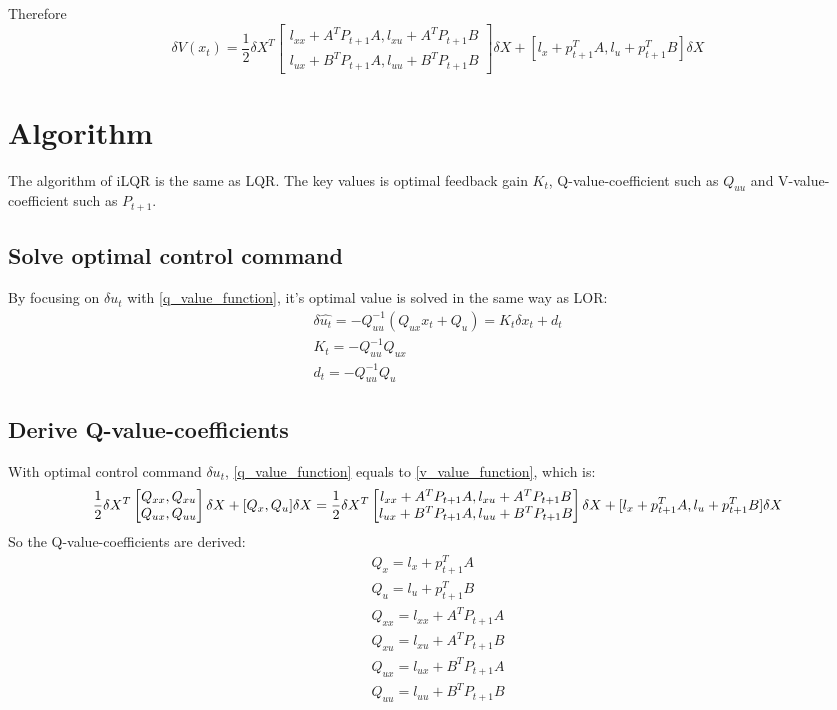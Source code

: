 \documentclass{article}
\begin{document}
Therefore
\begin{equation}
    \delta{V(x_{t})} = \frac{1}{2} \delta{X}^T \begin{bmatrix}
        l_{xx} + A^T P_{t+1} A, l_{xu} + A^T P_{t+1} B\\
        l_{ux} + B^T P_{t+1} A, l_{uu} + B^T P_{t+1} B
    \end{bmatrix} \delta{X} + [l_x + p_{t+1}^T A, l_u + p_{t+1}^T B] \delta{X} \label{v_value_function}
\end{equation}

\section{Algorithm}
The algorithm of iLQR is the same as LQR. The key values is optimal feedback gain $K_t$, Q-value-coefficient such as $Q_{uu}$ and V-value-coefficient such as $P_{t+1}$.
\subsection{Solve optimal control command}
By focusing on $\delta{u_t}$ with \eqref{q_value_function}, it's optimal value is solved in the same way as LOR:
\begin{gather}
    \delta{\hat{u_t}} = -Q_{uu}^{-1}(Q_{ux}x_t + Q_u) = K_t \delta{x_t} + d_t \label{optimal_control_command}\\
    K_t = -Q_{uu}^{-1} Q_{ux}\\
    d_t = -Q_{uu}^{-1} Q_u
\end{gather}

\subsection{Derive Q-value-coefficients}
With optimal control command $\delta{u_t}$, \eqref{q_value_function} equals to \eqref{v_value_function}, which is:
\begin{equation}
    \frac{1}{2} \delta{X}^T \begin{bmatrix}Q_{xx}, Q_{xu}\\Q_{ux}, Q_{uu} \end{bmatrix} \delta{X} + [Q_x, Q_u] \delta{X}\\
    = \frac{1}{2} \delta{X}^T \begin{bmatrix}
        l_{xx} + A^T P_{t+1} A, l_{xu} + A^T P_{t+1} B\\
        l_{ux} + B^T P_{t+1} A, l_{uu} + B^T P_{t+1} B
    \end{bmatrix} \delta{X} + [l_x + p_{t+1}^T A, l_u + p_{t+1}^T B] \delta{X}
\end{equation}
So the Q-value-coefficients are derived:
\begin{gather}
    Q_x = l_x + p_{t+1}^T A\\
    Q_u = l_u + p_{t+1}^T B\\
    Q_{xx} = l_{xx} + A^T P_{t+1} A\\
    Q_{xu} = l_{xu} + A^T P_{t+1} B\\
    Q_{ux} = l_{ux} + B^T P_{t+1} A\\
    Q_{uu} = l_{uu} + B^T P_{t+1} B
\end{gather}
\end{document}
